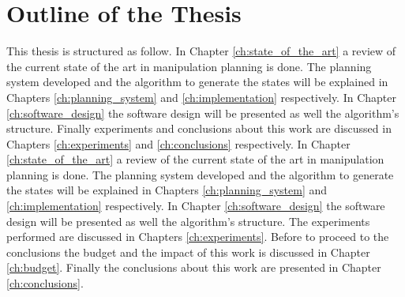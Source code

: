 \section{Outline of the Thesis}
This thesis is structured as follow. %
In Chapter \ref{ch:state_of_the_art} a review of the current state of the art in manipulation planning is done. The planning system developed and the algorithm to generate the states will be explained in Chapters \ref{ch:planning_system} and \ref{ch:implementation} respectively. In Chapter \ref{ch:software_design} the software design will be presented as well the algorithm's structure. Finally  experiments and conclusions about this work are discussed in Chapters \ref{ch:experiments} and \ref{ch:conclusions} respectively. In Chapter \ref{ch:state_of_the_art} a review of the current state of the art in manipulation planning is done. The planning system developed and the algorithm to generate the states will be explained in Chapters \ref{ch:planning_system} and \ref{ch:implementation} respectively. In Chapter \ref{ch:software_design} the software design will be presented as well the algorithm's structure. The experiments performed are discussed in Chapters \ref{ch:experiments}. Before to proceed to the conclusions the budget and the impact of this work is discussed in Chapter \ref{ch:budget}.
Finally the conclusions about this work are presented in Chapter \ref{ch:conclusions}.	




